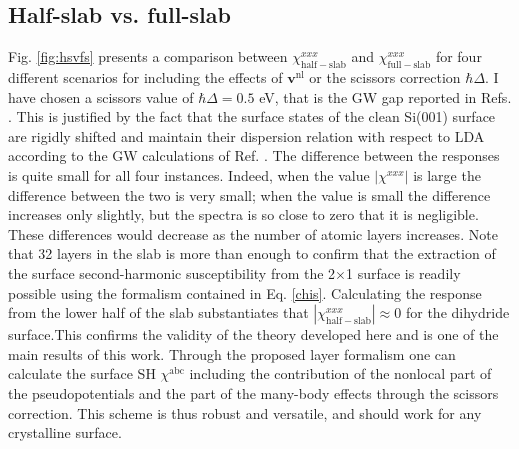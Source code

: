 
\subsection{Half-slab vs. full-slab}

Fig. \ref{fig:hsvfs} presents a comparison between
$\chi^{xxx}_{\mathrm{half-slab}}$ and $\chi^{xxx}_{\mathrm{full-slab}}$ for four
different scenarios for including the effects of $\mathbf{v}^\mathrm{nl}$ or the
scissors correction $\hbar\Delta$. I have chosen a scissors value of
$\hbar\Delta=0.5$ eV, that is the GW gap reported in Refs.
\cite{rohlfingPRB95,garciaCPC01}. This is justified by the fact that the surface
states of the clean Si(001) surface are rigidly shifted and maintain their
dispersion relation with respect to LDA according to the GW calculations of Ref.
\cite{rohlfingPRB95}. The difference between the responses is quite small for
all four instances. Indeed, when the value $|\chi^{xxx}|$ is large the
difference between the two is very small; when the value is small the difference
increases only slightly, but the spectra is so close to zero that it is
negligible. These differences would decrease as the number of atomic layers
increases. Note that 32 layers in the slab is more than enough to confirm that
the extraction of the surface second-harmonic susceptibility from the 2$\times$1
surface is readily possible using the formalism contained in Eq. \eqref{chis}.
Calculating the response from the lower half of the slab substantiates that
$|\chi^{xxx}_{\mathrm{half-slab}}|\approx 0$ for the dihydride surface.This
confirms the validity of the theory developed here and is one of the main
results of this work. Through the proposed layer formalism one can calculate the
surface SH $\chi^{\mathrm{a}\mathrm{b}\mathrm{c}}$
including the contribution of the nonlocal part of the pseudopotentials and the
part of the many-body effects through the scissors correction. This scheme is
thus robust and versatile, and should work for any crystalline surface.

